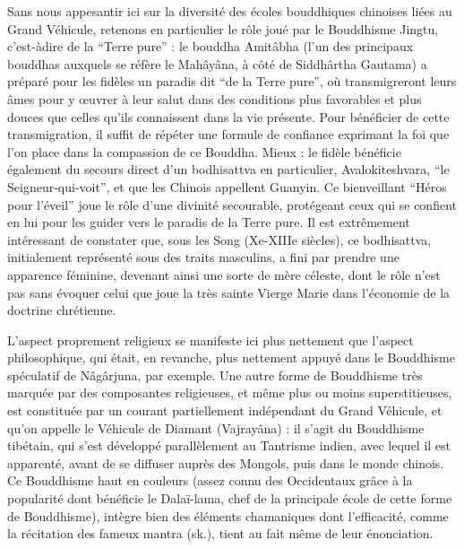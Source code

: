 \documentclass[11pt,a4paper]{article} %
\begin{document}
Sans nous appesantir ici sur la diversité des écoles bouddhiques chinoises liées au
Grand Véhicule, retenons en particulier le rôle joué par le Bouddhisme Jingtu, c'est-àdire de la ``Terre pure'' : le bouddha Amitâbha (l'un des principaux bouddhas auxquels
se réfère le Mahâyâna, à côté de Siddhârtha Gautama) a préparé pour les fidèles un paradis dit ``de la Terre pure'', où transmigreront leurs âmes pour y œuvrer à leur salut
dans des conditions plus favorables et plus douces que celles qu'ils connaissent dans la
vie présente.
Pour bénéficier de cette transmigration, il suffit de répéter une formule de
confiance exprimant la foi que l'on place dans la compassion de ce Bouddha.
Mieux : le
fidèle bénéficie également du secours direct d'un bodhisattva en particulier, Avalokiteshvara, ``le Seigneur-qui-voit'', et que les Chinois appellent Guanyin.
Ce bienveillant
``Héros pour l'éveil'' joue le rôle d'une divinité secourable, protégeant ceux qui se
confient en lui pour les guider vers le paradis de la Terre pure.
Il est extrêmement intéressant de constater que, sous les Song (Xe-XIIIe siècles), ce bodhisattva, initialement
représenté sous des traits masculins, a fini par prendre une apparence féminine, devenant ainsi une sorte de mère céleste, dont le rôle n'est pas sans évoquer celui que joue la
très sainte Vierge Marie dans l'économie de la doctrine chrétienne.

L'aspect proprement religieux se manifeste ici plus nettement que l'aspect philosophique, qui était, en revanche, plus nettement appuyé dans le Bouddhisme spéculatif de
Nâgârjuna, par exemple.
Une autre forme de Bouddhisme très marquée par des composantes religieuses, et même plus ou moins superstitieuses, est constituée par un courant
partiellement indépendant du Grand Véhicule, et qu'on appelle le Véhicule de Diamant
(Vajrayâna) : il s'agit du Bouddhisme tibétain, qui s'est développé parallèlement au
Tantrisme indien, avec lequel il est apparenté, avant de se diffuser auprès des Mongols,
puis dans le monde chinois.
Ce Bouddhisme haut en couleurs (assez connu des Occidentaux grâce à la popularité dont bénéficie le Dalaï-lama, chef de la principale école de
cette forme de Bouddhisme), intègre bien des éléments chamaniques dont l'efficacité,
comme la récitation des fameux mantra (sk.), tient au fait même de leur énonciation.
\end{document}
